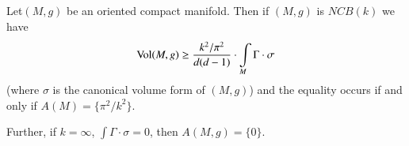 \setcounter{subsection}{6}

\subsection{}\label{chap8:8.4.7}

\begin{prop*}
Let\pageoriginale $(M,g)$ be an oriented compact manifold. Then if $(M,g)$ is
$NCB(k)$ we have
$$
\operatorname{Vol}(M,g)\geq
\dfrac{k^{2}/\pi^{2}}{d(d-1)}\cdot\int\limits_{M}\Gamma\cdot \sigma
$$
(where $\sigma$ is the canonical volume form of $(M,g)$) and the
equality occurs if and only if $A(M)=\{\pi^{2}/k^{2}\}$.

Further, if $k=\infty$, $\int\Gamma\cdot \sigma=0$, then $A(M,g)=\{0\}$.
\end{prop*}

